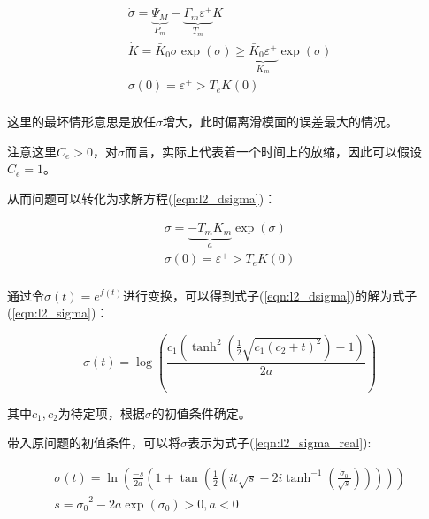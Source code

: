 \begin{equation}
    \begin{array}{c}
        \dot{\sigma}=\underset{P_m}{\underbrace{\varPsi _M}}-\underset{T_m}{\underbrace{\varGamma _m\varepsilon ^+}}K\\
        \dot{K}=\bar{K}_0\sigma \exp \left( \sigma \right) \ge \underset{K_m}{\underbrace{\bar{K}_0\varepsilon ^+}}\exp \left( \sigma \right)\\
        \sigma \left( 0 \right) =\varepsilon ^+>T_eK\left( 0 \right)\\
    \end{array}
    \label{eqn:l2_worst_case}
\end{equation}

这里的最坏情形意思是放任$\sigma$增大，此时偏离滑模面的误差最大的情况。

注意这里$C_e>0$，对$\sigma$而言，实际上代表着一个时间上的放缩，因此可以假设$C_e=1$。

从而问题可以转化为求解方程(\ref{eqn:l2_dsigma})：

\begin{equation}
    \begin{array}{c}
        \ddot{\sigma}=\underset{a}{\underbrace{-T_mK_m}}\exp \left( \sigma \right)\\
        \sigma \left( 0 \right) =\varepsilon ^+>T_eK\left( 0 \right)\\
    \end{array}
    \label{eqn:l2_dsigma}
\end{equation}

通过令$\sigma(t)=e^{f(t)}$进行变换，可以得到式子(\ref{eqn:l2_dsigma})的解为式子(\ref{eqn:l2_sigma})：

\begin{equation}
    \sigma \left( t \right) =\log \left( \frac{c_1\left( \tanh ^2\left( \frac{1}{2}\sqrt{c_1(c_2+t)^2} \right) -1 \right)}{2a} \right) 
    \label{eqn:l2_sigma}
\end{equation}

其中$c_1,c_2$为待定项，根据$\sigma$的初值条件确定。

带入原问题的初值条件，可以将$\sigma$表示为式子(\ref{eqn:l2_sigma_real}):

\begin{equation}
    \begin{array}{c}
        \sigma \left( t \right) =\ln \left( \frac{-s}{2a}\left( 1+\tan \left( \frac{1}{2}\left( it\sqrt{s}-2i\tanh ^{-1}\left( \frac{\dot{\sigma}_0}{\sqrt{s}} \right) \right) \right) \right) \right)\\
        s={\dot{\sigma}_0}^2-2a\exp \left( \sigma _0 \right) >0, a<0\\
    \end{array}
    \label{eqn:l2_sigma_real}
\end{equation}

